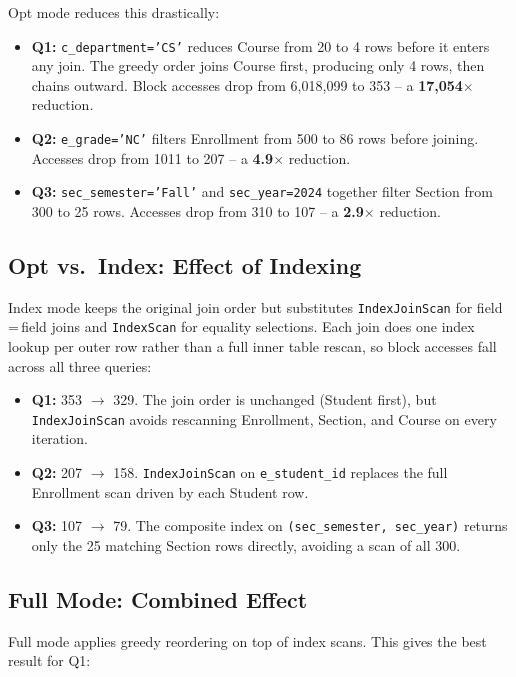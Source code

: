 \documentclass[12pt,a4paper]{article}
\begin{document}
Opt mode reduces this drastically:
\begin{itemize}[nosep]
  \item \textbf{Q1:} \texttt{c\_department='CS'} reduces Course from 20 to 4 rows before it enters any join. The greedy order joins Course first, producing only 4 rows, then chains outward. Block accesses drop from 6,018,099 to 353 -- a \textbf{17,054$\times$} reduction.
  \item \textbf{Q2:} \texttt{e\_grade='NC'} filters Enrollment from 500 to 86 rows before joining. Accesses drop from 1011 to 207 -- a \textbf{4.9$\times$} reduction.
  \item \textbf{Q3:} \texttt{sec\_semester='Fall'} and \texttt{sec\_year=2024} together filter Section from 300 to 25 rows. Accesses drop from 310 to 107 -- a \textbf{2.9$\times$} reduction.
\end{itemize}

\subsection{Opt vs.\ Index: Effect of Indexing}

Index mode keeps the original join order but substitutes \texttt{IndexJoinScan} for
field\,=\,field joins and \texttt{IndexScan} for equality selections. Each join does one
index lookup per outer row rather than a full inner table rescan, so block accesses
fall across all three queries:

\begin{itemize}[nosep]
  \item \textbf{Q1:} 353 $\to$ 329. The join order is unchanged (Student first), but \texttt{IndexJoinScan} avoids rescanning Enrollment, Section, and Course on every iteration.
  \item \textbf{Q2:} 207 $\to$ 158. \texttt{IndexJoinScan} on \texttt{e\_student\_id} replaces the full Enrollment scan driven by each Student row.
  \item \textbf{Q3:} 107 $\to$ 79. The composite index on \texttt{(sec\_semester, sec\_year)} returns only the 25 matching Section rows directly, avoiding a scan of all 300.
\end{itemize}

\subsection{Full Mode: Combined Effect}

Full mode applies greedy reordering on top of index scans. This gives the best result for Q1:
\end{document}
